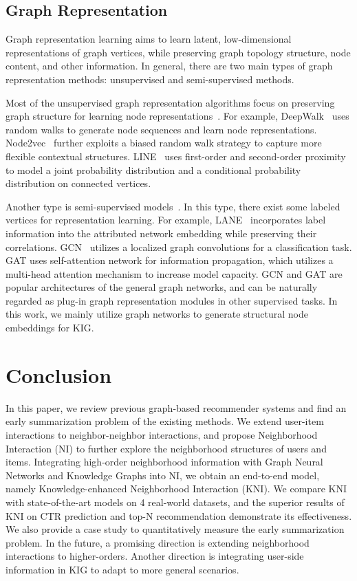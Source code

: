\documentclass[sigconf]{acmart}
\begin{document}
\subsection{Graph Representation}
Graph representation learning aims to learn latent, low-dimensional representations of graph vertices, while preserving graph topology structure, node content, and other information.
In general, there are two main types of graph representation methods: unsupervised and semi-supervised methods. 

Most of the unsupervised graph representation algorithms focus on preserving graph structure for learning node representations~\cite{perozzi2014deepwalk, grover2016node2vec, tang2015line}. For example, DeepWalk~\cite{perozzi2014deepwalk} uses random walks to generate node sequences and learn node representations. Node2vec~\cite{grover2016node2vec} further exploits a biased random walk strategy to capture more flexible contextual structures. LINE~\cite{tang2015line} uses first-order and second-order proximity to model a joint probability distribution and a conditional probability distribution on connected vertices. 

Another type is semi-supervised models~\cite{huang2017label, kipf2016semi, velickovic2017graph}. In this type, there exist some labeled vertices for representation learning. 
For example, 
LANE~\cite{huang2017label} incorporates label information into the attributed network embedding while preserving their correlations.
GCN~\cite{kipf2016semi} utilizes a localized graph convolutions for a classification task. 
GAT \cite{velickovic2017graph} uses self-attention network for information propagation, which utilizes a multi-head attention mechanism to increase model capacity.
GCN and GAT are popular architectures of the general graph networks, and can be naturally regarded as plug-in graph representation modules in other supervised tasks.
In this work, we mainly utilize graph networks to generate structural node embeddings for KIG.

\section{Conclusion} \label{sec:co}

In this paper, we review previous graph-based recommender systems and find an early summarization problem of the existing methods. 
We extend user-item interactions to neighbor-neighbor interactions, and propose Neighborhood Interaction (NI) to further explore the neighborhood structures of users and items.
Integrating high-order neighborhood information with Graph Neural Networks and Knowledge Graphs into NI, we obtain an end-to-end model, namely Knowledge-enhanced Neighborhood Interaction (KNI). We compare KNI with state-of-the-art models on 4 real-world datasets, and the superior results of KNI on CTR prediction and top-N recommendation demonstrate its effectiveness. We also provide a case study to quantitatively measure the early summarization problem. In the future, a promising direction is extending neighborhood interactions to higher-orders. Another direction is integrating user-side information in KIG to adapt to more general scenarios.
\end{document}
